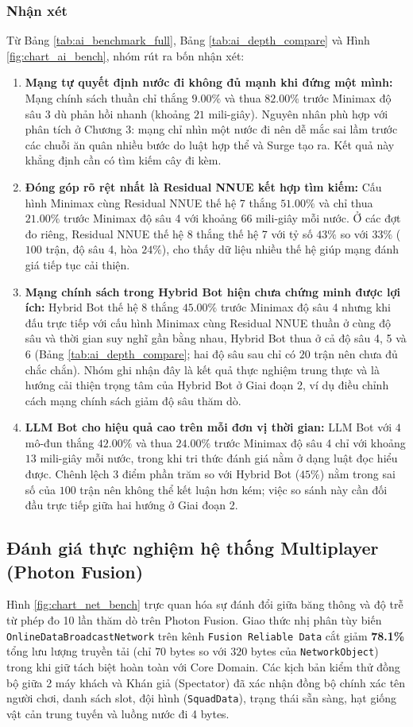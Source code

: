 \subsubsection{Nhận xét}
Từ Bảng \ref{tab:ai_benchmark_full}, Bảng \ref{tab:ai_depth_compare} và Hình \ref{fig:chart_ai_bench}, nhóm rút ra bốn nhận xét:
\begin{enumerate}
    \item \textbf{Mạng tự quyết định nước đi không đủ mạnh khi đứng một mình:} Mạng chính sách thuần chỉ thắng $9.00\%$ và thua $82.00\%$ trước Minimax độ sâu 3 dù phản hồi nhanh (khoảng $21$ mili-giây). Nguyên nhân phù hợp với phân tích ở Chương 3: mạng chỉ nhìn một nước đi nên dễ mắc sai lầm trước các chuỗi ăn quân nhiều bước do luật hợp thể và Surge tạo ra. Kết quả này khẳng định cần có tìm kiếm cây đi kèm.
    \item \textbf{Đóng góp rõ rệt nhất là Residual NNUE kết hợp tìm kiếm:} Cấu hình Minimax cùng Residual NNUE thế hệ 7 thắng $51.00\%$ và chỉ thua $21.00\%$ trước Minimax độ sâu 4 với khoảng $66$ mili-giây mỗi nước. Ở các đợt đo riêng, Residual NNUE thế hệ 8 thắng thế hệ 7 với tỷ số $43\%$ so với $33\%$ ($100$ trận, độ sâu 4, hòa $24\%$), cho thấy dữ liệu nhiều thế hệ giúp mạng đánh giá tiếp tục cải thiện.
    \item \textbf{Mạng chính sách trong Hybrid Bot hiện chưa chứng minh được lợi ích:} Hybrid Bot thế hệ 8 thắng $45.00\%$ trước Minimax độ sâu 4 nhưng khi đấu trực tiếp với cấu hình Minimax cùng Residual NNUE thuần ở cùng độ sâu và thời gian suy nghĩ gần bằng nhau, Hybrid Bot thua ở cả độ sâu 4, 5 và 6 (Bảng \ref{tab:ai_depth_compare}; hai độ sâu sau chỉ có $20$ trận nên chưa đủ chắc chắn). Nhóm ghi nhận đây là kết quả thực nghiệm trung thực và là hướng cải thiện trọng tâm của Hybrid Bot ở Giai đoạn 2, ví dụ điều chỉnh cách mạng chính sách giảm độ sâu thăm dò.
    \item \textbf{LLM Bot cho hiệu quả cao trên mỗi đơn vị thời gian:} LLM Bot với $4$ mô-đun thắng $42.00\%$ và thua $24.00\%$ trước Minimax độ sâu 4 chỉ với khoảng $13$ mili-giây mỗi nước, trong khi tri thức đánh giá nằm ở dạng luật đọc hiểu được. Chênh lệch $3$ điểm phần trăm so với Hybrid Bot ($45\%$) nằm trong sai số của $100$ trận nên không thể kết luận hơn kém; việc so sánh này cần đối đầu trực tiếp giữa hai hướng ở Giai đoạn 2.
\end{enumerate}

\subsection{Đánh giá thực nghiệm hệ thống Multiplayer (Photon Fusion)}
Hình \ref{fig:chart_net_bench} trực quan hóa sự đánh đổi giữa băng thông và độ trễ từ phép đo 10 lần thăm dò trên Photon Fusion. Giao thức nhị phân tùy biến \texttt{OnlineDataBroadcastNetwork} trên kênh \texttt{Fusion Reliable Data} cắt giảm \textbf{78.1\%} tổng lưu lượng truyền tải (chỉ $70$ bytes so với $320$ bytes của \texttt{NetworkObject}) trong khi giữ tách biệt hoàn toàn với Core Domain. Các kịch bản kiểm thử đồng bộ giữa 2 máy khách và Khán giả (Spectator) đã xác nhận đồng bộ chính xác tên người chơi, danh sách slot, đội hình (\texttt{SquadData}), trạng thái sẵn sàng, hạt giống vật cản trung tuyến và luồng nước đi 4 bytes.

